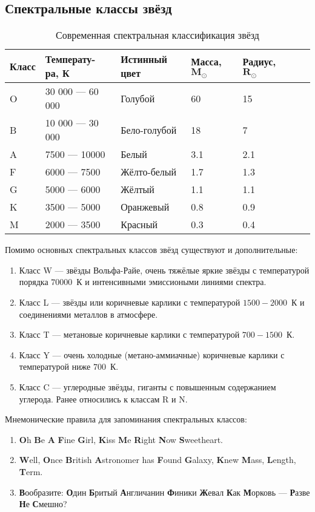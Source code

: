 \subsection{Спектральные классы звёзд}
\begin{center}
\begin{table}[h!]
\begin{tabularx}{\textwidth}{|X|X|X|X|X|X|X|}
\hline
{\bfseries Класс} & {\bfseries Температу- ра, К} & {\bfseries Истинный цвет} & {\bfseries Масса, $\mathbf{M_{\odot}}$} & {\bfseries Радиус, $\mathbf{R_{\odot}}$}\\
\hline
O & 30 000 --- 60 000 & Голубой & 60 & 15\\
\hline
B & 10 000 --- 30 000 & Бело-голубой & 18 & 7\\
\hline
A & 7500 --- 10000 & Белый & 3.1 & 2.1\\
\hline
F & 6000 --- 7500 & Жёлто-белый & 1.7 & 1.3\\
\hline
G & 5000 --- 6000 & Жёлтый & 1.1 & 1.1\\
\hline 
K & 3500 --- 5000 & Оранжевый & 0.8 & 0.9\\
\hline
M & 2000 --- 3500 & Красный & 0.3 & 0.4\\
\hline
\end{tabularx}
\caption{Современная спектральная классификация звёзд}
\end{table}
\end{center}

Помимо основных спектральных классов звёзд существуют и дополнительные:
\begin{enumerate}
\item Класс W --- звёзды Вольфа-Райе, очень тяжёлые яркие звёзды с температурой порядка $70000$~К и интенсивными эмиссиоными линиями спектра.
\item Класс L --- звёзды или коричневые карлики с температурой $1500 - 2000$~К и соединениями металлов в атмосфере.
\item Класс T --- метановые коричневые карлики с температурой $700 - 1500$~К.
\item Класс Y ---  очень холодные (метано-аммиачные) коричневые карлики с температурой ниже $700$~К.
\item Класс C --- углеродные звёзды, гиганты с повышенным содержанием углерода. Ранее относились к классам R и N.
\end{enumerate}

Мнемонические правила для запоминания спектральных классов:
\begin{enumerate}
\item\textbf{O}h \textbf{B}e \textbf{A} \textbf{F}ine \textbf{G}irl, \textbf{K}iss \textbf{M}e \textbf{R}ight \textbf{N}ow \textbf{S}weetheart.
\item\textbf{W}ell, \textbf{O}nce \textbf{B}ritish \textbf{A}stronomer has \textbf{F}ound \textbf{G}alaxy, \textbf{K}new \textbf{M}ass, \textbf{L}ength, \textbf{T}erm.
\item \textbf{В}ообразите: \textbf{О}дин \textbf{Б}ритый \textbf{А}нгличанин \textbf{Ф}иники \textbf{Ж}евал \textbf{К}ак \textbf{М}орковь --- \textbf{Р}азве \textbf{Н}е \textbf{С}мешно?
\end{enumerate}

